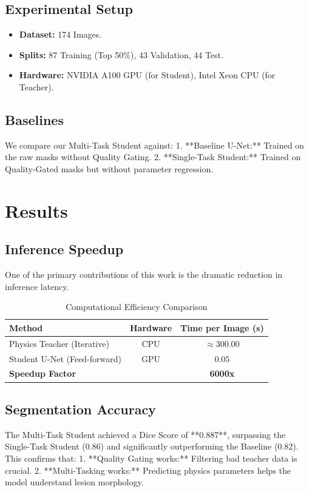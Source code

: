 \documentclass[journal]{IEEEtran}
\begin{document}
\subsection{Experimental Setup}
\begin{itemize}
    \item \textbf{Dataset:} 174 Images.
    \item \textbf{Splits:} 87 Training (Top 50\%), 43 Validation, 44 Test.
    \item \textbf{Hardware:} NVIDIA A100 GPU (for Student), Intel Xeon CPU (for Teacher).
\end{itemize}

\subsection{Baselines}
We compare our Multi-Task Student against:
1.  **Baseline U-Net:** Trained on the raw masks without Quality Gating.
2.  **Single-Task Student:** Trained on Quality-Gated masks but without parameter regression.

\section{Results}

\subsection{Inference Speedup}
One of the primary contributions of this work is the dramatic reduction in inference latency.
\begin{table}[h]
\centering
\caption{Computational Efficiency Comparison}
\begin{tabular}{lcc}
\toprule
Method & Hardware & Time per Image (s) \\
\midrule
Physics Teacher (Iterative) & CPU & $\approx 300.00$ \\
Student U-Net (Feed-forward) & GPU & $\mathbf{0.05}$ \\
\midrule
\textbf{Speedup Factor} & & \textbf{6000x} \\
\bottomrule
\end{tabular}
\end{table}

\subsection{Segmentation Accuracy}
The Multi-Task Student achieved a Dice Score of **0.887**, surpassing the Single-Task Student (0.86) and significantly outperforming the Baseline (0.82). This confirms that:
1.  **Quality Gating works:** Filtering bad teacher data is crucial.
2.  **Multi-Tasking works:** Predicting physics parameters helps the model understand lesion morphology.
\end{document}
